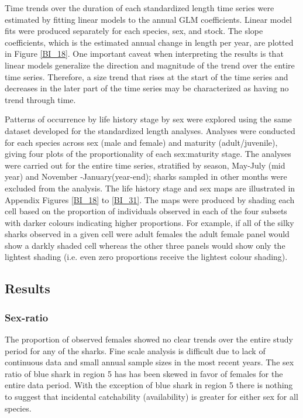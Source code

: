 \documentclass[12pt]{SCreport}
\begin{document}
Time trends over the duration of each standardized length time series were estimated by fitting linear models to the annual GLM coefficients.  Linear model fits were produced separately for each species, sex, and stock.   The slope coefficients, which is the estimated annual change in length per year, are plotted in Figure \ref{BI_18}.  One important caveat when interpreting the results is that linear models generalize the direction and magnitude of the trend over the entire time series. Therefore, a size trend that rises at the start of the time series and decreases in the later part of the time series may be characterized as having no trend through time.


Patterns of occurrence by life history stage by sex were explored using the same dataset developed for the standardized length analyses.  Analyses were conducted for each species  across sex (male and female) and maturity (adult/juvenile), giving four plots of the proportionality of each sex:maturity stage.  The analyses were carried out for the entire time series, stratified by season,  May-July (mid year) and November -January(year-end); sharks sampled in other months were excluded from the analysis.  The life history stage and sex maps are illustrated in Appendix Figures \ref{BI_18} to \ref{BI_31}.  The maps were produced by shading each cell based on the proportion of individuals observed in each of the four subsets with darker colours indicating higher proportions. For example, if all of the silky sharks observed in a given cell were adult females the adult female panel would show a darkly shaded cell whereas the other three panels would show only the lightest shading (i.e. even zero proportions receive the lightest colour shading). 

% 
\subsection{Results}
\subsubsection{Sex-ratio}
    The proportion of observed females showed no clear trends over the entire study period for any of the sharks.  Fine scale analysis is difficult due to lack of continuous data and small annual sample sizes in the most recent years.   The sex ratio of blue shark in region 5 has has been skewed in favor of females for the entire data period. With the exception of blue shark in region 5 there is nothing to suggest that incidental catchability (availability) is greater for either sex for all species.
    
\end{document}
